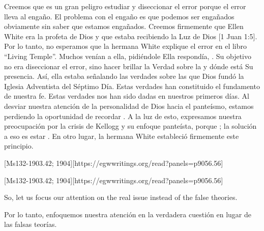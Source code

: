 Creemos que es un gran peligro estudiar y diseccionar el error porque el error lleva al engaño. El problema con el engaño es que podemos ser engañados obviamente sin saber que estamos engañados. Creemos firmemente que Ellen White era la profeta de Dios y que estaba recibiendo la Luz de Dios [1 Juan 1:5]. Por lo tanto, no esperamos que la hermana White explique el error en el libro “Living Temple”. Muchos venían a ella, pidiéndole  Ella respondía, . Su objetivo no era diseccionar el error, sino hacer brillar la Verdad sobre la  y dónde está Su presencia. Así, ella estaba señalando las verdades sobre las que Dios fundó la Iglesia Adventista del Séptimo Día. Estas verdades han constituido el fundamento de nuestra fe. Estas verdades nos han sido dadas en nuestros primeros días. Al desviar nuestra atención de la personalidad de Dios hacia el panteísmo, estamos perdiendo la oportunidad de recordar . A la luz de esto, expresamos nuestra preocupación por la crisis de Kellogg y su enfoque panteísta, porque ; la solución a eso es estar . En otro lugar, la hermana White estableció firmemente este principio.


[Ms132-1903.42; 1904][https://egwwritings.org/read?panels=p9056.56]


[Ms132-1903.42; 1904][https://egwwritings.org/read?panels=p9056.56]


So, let us focus our attention on the real issue instead of the false theories.


Por lo tanto, enfoquemos nuestra atención en la verdadera cuestión en lugar de las falsas teorías.






